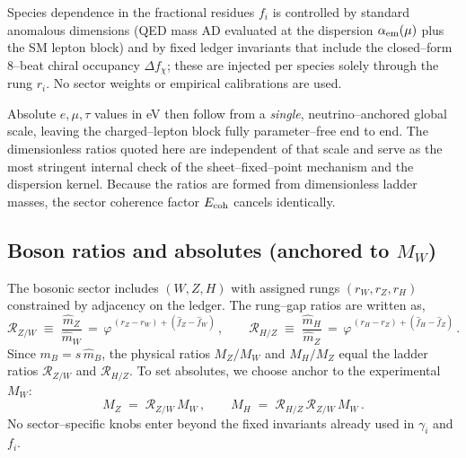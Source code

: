 \documentclass[%
  amsmath,amssymb,
  aps,
 prb,
 floatfix, showkeys
 ]{revtex4-2}
\begin{document}
 Species dependence in the fractional residues $f_i$ is controlled by standard anomalous dimensions (QED mass AD evaluated at the dispersion $\alpha_{\rm em}(\mu)$ plus the SM lepton block) and by fixed ledger invariants that include the closed–form 8–beat chiral occupancy $\Delta f_\chi$; these are injected per species solely through the rung $r_i$. No sector weights or empirical calibrations are used.
 
 Absolute $e,\mu,\tau$ values in eV then follow from a \emph{single}, neutrino–anchored global scale, leaving the charged–lepton block fully parameter–free end to end.
 The dimensionless ratios quoted here are independent of that scale and serve as the most
 stringent internal check of the sheet–fixed–point mechanism and the dispersion kernel.
 Because the ratios are formed from dimensionless ladder masses, the sector
 coherence factor $E_{\rm coh}$ cancels identically.
 
 \subsection{Boson ratios and absolutes (anchored to $M_W$)}
 \label{subsec:bosons}
 The bosonic sector includes $(W,Z,H)$ with assigned rungs $(r_W,r_Z,r_H)$ constrained by adjacency on the ledger.
 The rung--gap ratios are written as,
 \begin{equation}
   \mathcal{R}_{Z/W} \;\equiv\; \frac{\widehat m_Z}{\widehat m_W}
   \,=\, \varphi^{\,(r_Z-r_W) + (\widehat f_Z - \widehat f_W)}\,,\qquad
   \mathcal{R}_{H/Z} \;\equiv\; \frac{\widehat m_H}{\widehat m_Z}
   \,=\, \varphi^{\,(r_H-r_Z) + (\widehat f_H - \widehat f_Z)}\,.
   \label{eq:boson_ratios}
 \end{equation}
 Since $m_B=s\,\widehat m_B$, the physical ratios $M_Z/M_W$ and $M_H/M_Z$ equal the ladder ratios $\mathcal{R}_{Z/W}$ and $\mathcal{R}_{H/Z}$.
 To set absolutes, we choose anchor to the experimental $M_W$:
 \begin{equation}
   M_Z \;=\; \mathcal{R}_{Z/W}\,M_W\,,\qquad
   M_H \;=\; \mathcal{R}_{H/Z}\,\mathcal{R}_{Z/W}\,M_W\,.
   \label{eq:boson_absolutes}
 \end{equation}
 No sector--specific knobs enter beyond the fixed invariants already used in $\gamma_i$ and $f_i$.
 
\end{document}
